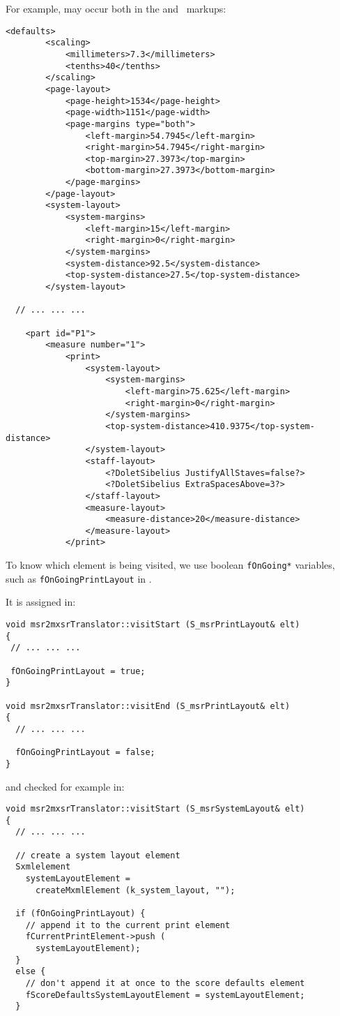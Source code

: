 For example,  may occur both in the  and  \mxml\ markups:
\begin{lstlisting}[language=MusicXML]
	<defaults>
		<scaling>
			<millimeters>7.3</millimeters>
			<tenths>40</tenths>
		</scaling>
		<page-layout>
			<page-height>1534</page-height>
			<page-width>1151</page-width>
			<page-margins type="both">
				<left-margin>54.7945</left-margin>
				<right-margin>54.7945</right-margin>
				<top-margin>27.3973</top-margin>
				<bottom-margin>27.3973</bottom-margin>
			</page-margins>
		</page-layout>
		<system-layout>
			<system-margins>
				<left-margin>15</left-margin>
				<right-margin>0</right-margin>
			</system-margins>
			<system-distance>92.5</system-distance>
			<top-system-distance>27.5</top-system-distance>
		</system-layout>

  // ... ... ...

	<part id="P1">
		<measure number="1">
			<print>
				<system-layout>
					<system-margins>
						<left-margin>75.625</left-margin>
						<right-margin>0</right-margin>
					</system-margins>
					<top-system-distance>410.9375</top-system-distance>
				</system-layout>
				<staff-layout>
					<?DoletSibelius JustifyAllStaves=false?>
					<?DoletSibelius ExtraSpacesAbove=3?>
				</staff-layout>
				<measure-layout>
					<measure-distance>20</measure-distance>
				</measure-layout>
			</print>
\end{lstlisting}

To know which element is being visited, we use boolean {\tt fOnGoing*} variables, such as {\tt fOnGoingPrintLayout} in .

It is assigned in:
\begin{lstlisting}[language=CPlusPlus]
void msr2mxsrTranslator::visitStart (S_msrPrintLayout& elt)
{
 // ... ... ...

 fOnGoingPrintLayout = true;
}

void msr2mxsrTranslator::visitEnd (S_msrPrintLayout& elt)
{
  // ... ... ...

  fOnGoingPrintLayout = false;
}
\end{lstlisting}

and checked for example in:
\begin{lstlisting}[language=CPlusPlus]
void msr2mxsrTranslator::visitStart (S_msrSystemLayout& elt)
{
  // ... ... ...

  // create a system layout element
  Sxmlelement
    systemLayoutElement =
      createMxmlElement (k_system_layout, "");

  if (fOnGoingPrintLayout) {
    // append it to the current print element
    fCurrentPrintElement->push (
      systemLayoutElement);
  }
  else {
    // don't append it at once to the score defaults element
    fScoreDefaultsSystemLayoutElement = systemLayoutElement;
  }
\end{lstlisting}


